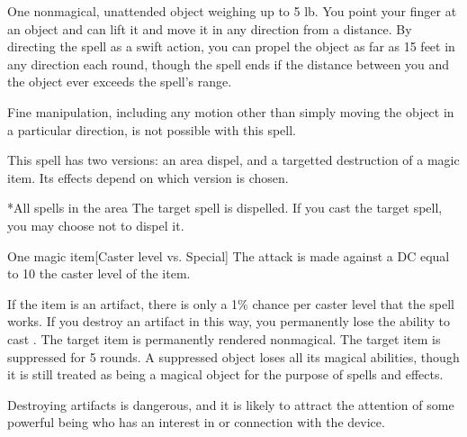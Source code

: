 \begin{spellheader}
    \spellrng{\rngclose}
    \spelldur{\durshort}
\end{spellheader}
\begin{spelleffects}
    \begin{spelltarget}{One nonmagical, unattended object weighing up to 5 lb.}
        \spelleffect You point your finger at an object and can lift it and move it in any direction from a distance. By directing the spell as a swift action, you can propel the object as far as 15 feet in any direction each round, though the spell ends if the distance between you and the object ever exceeds the spell's range.
    \end{spelltarget}
\end{spelleffects}
\begin{spellfooter}
    \spellnotes Fine manipulation, including any motion other than simply moving the object in a particular direction, is not possible with this spell.
\end{spellfooter}

\begin{spellheader}
    \spellspecial This spell has two versions: an area dispel, and a targetted destruction of a magic item. Its effects depend on which version is chosen.
\end{spellheader}
\begin{spelleffects}
    \begin{spelltargets}*{All spells in the area}
        \spelleffect The target spell is dispelled. If you cast the target spell, you may choose not to dispel it.
    \end{spelltargets}
    \begin{spelltarget}{One magic item}[Caster level vs. Special]
        \spellspecial The attack is made against a DC equal to 10 \add the caster level of the item.

        If the item is an artifact, there is only a 1\% chance per caster level that the spell works. If you destroy an artifact in this way, you permanently lose the ability to cast .
        \spellsuccess The target item is permanently rendered nonmagical.
        \spellfailure The target item is suppressed for 5 rounds. A suppressed object loses all its magical abilities, though it is still treated as being a magical object for the purpose of spells and effects.
    \end{spelltarget}
\end{spelleffects}
\begin{spellfooter}
    \spellnotes Destroying artifacts is dangerous, and it is likely to attract the attention of some powerful being who has an interest in or connection with the device.
\end{spellfooter}

